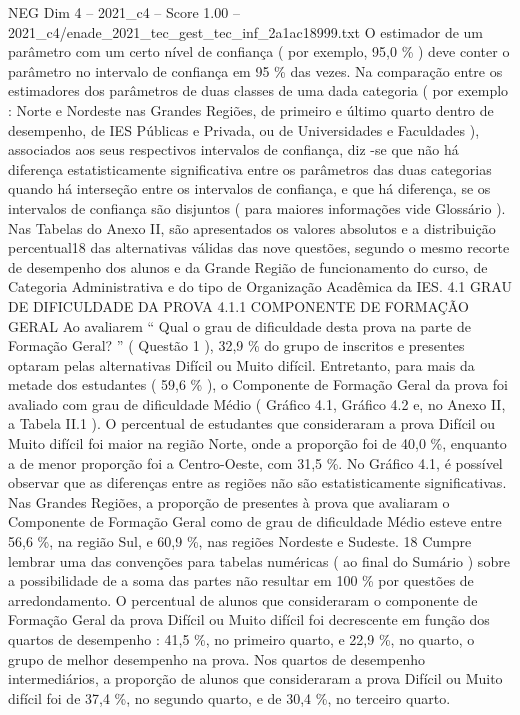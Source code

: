 \begin{textsample}{NEG Dim 4 – 2021\_c4 – Score 1.00 – 2021\_c4/enade\_2021\_tec\_gest\_tec\_inf\_2a1ac18999.txt}
O estimador de um parâmetro com um certo nível de confiança ( por exemplo, 95,0 \% ) deve conter o parâmetro no intervalo de confiança em 95 \% das vezes.
Na comparação entre os estimadores dos parâmetros de duas classes de uma dada categoria ( por exemplo : Norte e Nordeste nas Grandes Regiões, de primeiro e último quarto dentro de desempenho, de IES Públicas e Privada, ou de Universidades e Faculdades ), associados aos seus respectivos intervalos de confiança, diz -se que não há diferença estatisticamente significativa entre os parâmetros das duas categorias quando há interseção entre os intervalos de confiança, e que há diferença, se os intervalos de confiança são disjuntos ( para maiores informações vide Glossário ).
Nas Tabelas do Anexo II, são apresentados os valores absolutos e a distribuição percentual18 das alternativas válidas das nove questões, segundo o mesmo recorte de desempenho dos alunos e da Grande Região de funcionamento do curso, de Categoria Administrativa e do tipo de Organização Acadêmica da IES. 4.1 GRAU DE DIFICULDADE DA PROVA 4.1.1 COMPONENTE DE FORMAÇÃO GERAL Ao avaliarem “ Qual o grau de dificuldade desta prova na parte de Formação Geral? ” ( Questão 1 ), 32,9 \% do grupo de inscritos e presentes optaram pelas alternativas Difícil ou Muito difícil.
Entretanto, para mais da metade dos estudantes ( 59,6 \% ), o Componente de Formação Geral da prova foi avaliado com grau de dificuldade Médio ( Gráfico 4.1, Gráfico 4.2 e, no Anexo II, a Tabela II.1 ).
O percentual de estudantes que consideraram a prova Difícil ou Muito difícil foi maior na região Norte, onde a proporção foi de 40,0 \%, enquanto a de menor proporção foi a Centro-Oeste, com 31,5 \%.
No Gráfico 4.1, é possível observar que as diferenças entre as regiões não são estatisticamente significativas.
Nas Grandes Regiões, a proporção de presentes à prova que avaliaram o Componente de Formação Geral como de grau de dificuldade Médio esteve entre 56,6 \%, na região Sul, e 60,9 \%, nas regiões Nordeste e Sudeste. 18 Cumpre lembrar uma das convenções para tabelas numéricas ( ao final do Sumário ) sobre a possibilidade de a soma das partes não resultar em 100 \% por questões de arredondamento.
O percentual de alunos que consideraram o componente de Formação Geral da prova Difícil ou Muito difícil foi decrescente em função dos quartos de desempenho : 41,5 \%, no primeiro quarto, e 22,9 \%, no quarto, o grupo de melhor desempenho na prova.
Nos quartos de desempenho intermediários, a proporção de alunos que consideraram a prova Difícil ou Muito difícil foi de 37,4 \%, no segundo quarto, e de 30,4 \%, no terceiro quarto.

\end{textsample}
